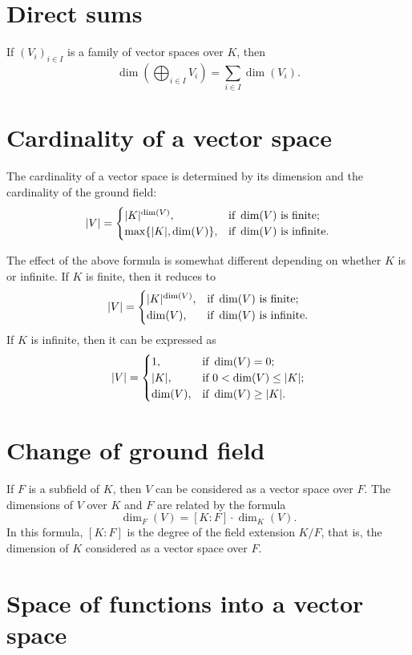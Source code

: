 \documentclass[12pt]{article}
\begin{document}
\section*{Direct sums}

If $(V_i)_{i\in I}$ is a family of vector spaces over $K$,
then
\[
  \dim\!\left(\bigoplus_{i\in I}V_i\right) = \sum_{i\in I}\dim(V_i).
\]

\section*{Cardinality of a vector space}

The cardinality of a vector space 
is determined by its dimension and the cardinality of the ground field:
\[
  |V|=\begin{cases}
        |K|^{\dim(V)},&\hbox{if }\dim(V)\hbox{ is finite};\\
        \max\{|K|,\dim(V)\},&\hbox{if }\dim(V)\hbox{ is infinite}.\cr
      \end{cases}
\]

The effect of the above formula is somewhat different
depending on whether $K$ is  or infinite.
If $K$ is finite, then it reduces to
\[
  |V|=\begin{cases}
         |K|^{\dim(V)},&\hbox{if }\dim(V)\hbox{ is finite};\\
         \dim(V),&\hbox{if }\dim(V)\hbox{ is infinite}.
      \end{cases}
\]
If $K$ is infinite, then it can be expressed as
\[
  |V|=\begin{cases}
         1,&\hbox{if }\dim(V)=0;\\
         |K|,&\hbox{if }0<\dim(V)\le|K|;\\
         \dim(V),&\hbox{if }\dim(V)\ge|K|.
      \end{cases}
\]

\section*{Change of ground field}

If $F$ is a subfield of $K$,
then $V$ can be considered as a vector space over $F$.
The dimensions of $V$ over $K$ and $F$ are related by the formula
\[
  \dim_F(V)=[K:F]\cdot\dim_K(V).
\]
In this formula, $[K:F]$ is the degree of the field extension $K/F$,
that is, the dimension of $K$ considered as a vector space over $F$.

\section*{Space of functions into a vector space}
\end{document}
